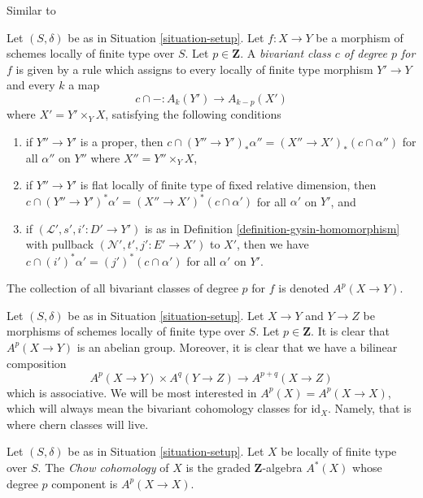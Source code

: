 \begin{definition}
\label{definition-bivariant-class}
\begin{reference}
Similar to \cite[Definition 17.1]{F}
\end{reference}
Let $(S, \delta)$ be as in Situation \ref{situation-setup}.
Let $f : X \to Y$ be a morphism of schemes locally of finite type over $S$.
Let $p \in \mathbf{Z}$.
A {\it bivariant class $c$ of degree $p$ for $f$} is given by a rule
which assigns to every locally of finite type morphism $Y' \to Y$
and every $k$ a map
$$
c \cap - : A_k(Y') \longrightarrow A_{k - p}(X')
$$
where $X' = Y' \times_Y X$, satisfying the following conditions
\begin{enumerate}
\item if $Y'' \to Y'$ is a proper, then
$c \cap (Y'' \to Y')_*\alpha'' = (X'' \to X')_*(c \cap \alpha'')$
for all $\alpha''$ on $Y''$ where $X'' = Y'' \times_Y X$,
\item if $Y'' \to Y'$ is flat locally of finite type of
fixed relative dimension, then
$c \cap (Y'' \to Y')^*\alpha' = (X'' \to X')^*(c \cap \alpha')$
for all $\alpha'$ on $Y'$, and
\item if $(\mathcal{L}', s', i' : D' \to Y')$ is as in
Definition \ref{definition-gysin-homomorphism}
with pullback $(\mathcal{N}', t', j' : E' \to X')$ to $X'$,
then we have $c \cap (i')^*\alpha' = (j')^*(c \cap \alpha')$
for all $\alpha'$ on $Y'$.
\end{enumerate}
The collection of all bivariant classes of degree $p$ for $f$ is
denoted $A^p(X \to Y)$.
\end{definition}

\noindent
Let $(S, \delta)$ be as in Situation \ref{situation-setup}. Let $X \to Y$
and $Y \to Z$
be morphisms of schemes locally of finite type over $S$. Let
$p \in \mathbf{Z}$. It is clear that $A^p(X \to Y)$ is an abelian group.
Moreover, it is clear that we have a bilinear composition
$$
A^p(X \to Y) \times A^q(Y \to Z) \to A^{p + q}(X \to Z)
$$
which is associative.
We will be most interested in $A^p(X) = A^p(X \to X)$, which will always mean
the bivariant cohomology classes for $\text{id}_X$. Namely, that is where
chern classes will live.

\begin{definition}
\label{definition-chow-cohomology}
Let $(S, \delta)$ be as in Situation \ref{situation-setup}.
Let $X$ be locally of finite type over $S$. The {\it Chow cohomology}
of $X$ is the graded $\mathbf{Z}$-algebra $A^*(X)$ whose degree
$p$ component is $A^p(X \to X)$.
\end{definition}

